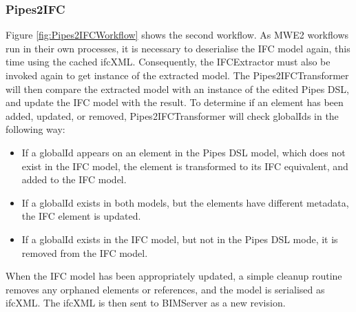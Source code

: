 \subsubsection{Pipes2IFC}
Figure \ref{fig:Pipes2IFCWorkflow} shows the second workflow. As MWE2 workflows run in their own processes, it is necessary to deserialise the IFC model again, this time using the cached ifcXML. Consequently, the IFCExtractor must also be invoked again to get instance of the extracted model. The Pipes2IFCTransformer will then compare the extracted model with an instance of the edited Pipes DSL, and update the IFC model with the result. To determine if an element has been added, updated, or removed, Pipes2IFCTransformer will check globalIds in the following way:
\begin{itemize}
\item If a globalId appears on an element in the Pipes DSL model, which does not exist in the IFC model, the element is transformed to its IFC equivalent, and added to the IFC model.
\item If a globalId exists in both models, but the elements have different metadata, the IFC element is updated.
\item If a globalId exists in the IFC model, but not in the Pipes DSL mode, it is removed from the IFC model.
\end{itemize}
When the IFC model has been appropriately updated, a simple cleanup routine removes any orphaned elements or references, and the model is serialised as ifcXML. The ifcXML is then sent to BIMServer as a new revision.
